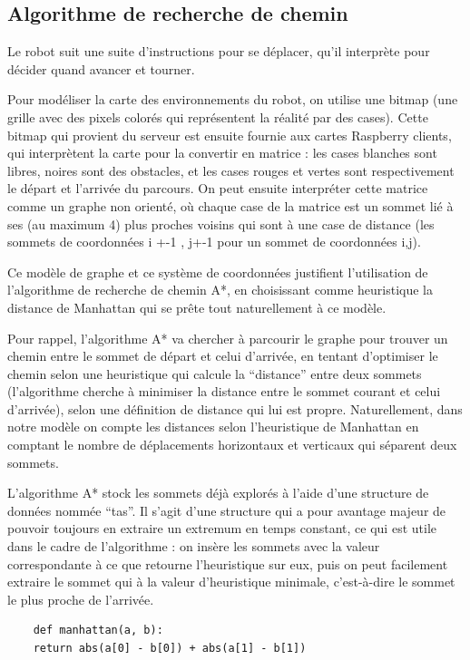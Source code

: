 \documentclass[a4paper,12pt]{report}  %
\begin{document}
\subsection{Algorithme de recherche de chemin}
Le robot suit une suite d’instructions pour se déplacer, qu’il interprète pour décider quand avancer et tourner.

Pour modéliser la carte des environnements du robot, on utilise une bitmap (une grille avec des pixels colorés qui représentent la réalité par des cases). Cette bitmap qui provient du serveur est ensuite fournie aux cartes Raspberry clients, qui interprètent la carte pour la convertir en matrice : les cases blanches sont libres, noires sont des obstacles, et les cases rouges et vertes sont respectivement le départ et l’arrivée du parcours. On peut ensuite interpréter cette matrice comme un graphe non orienté, où chaque case de la matrice est un sommet lié à ses (au maximum 4) plus proches voisins qui sont à une case de distance (les sommets de coordonnées i +-1 , j+-1 pour un sommet de coordonnées i,j).

Ce modèle de graphe et ce système de coordonnées justifient l’utilisation de l’algorithme de recherche de chemin A*, en choisissant comme heuristique la distance de Manhattan qui se prête tout naturellement à ce modèle.

Pour rappel, l’algorithme A* va chercher à parcourir le graphe pour trouver un chemin entre le sommet de départ et celui d’arrivée, en tentant d’optimiser le chemin selon une heuristique qui calcule la “distance” entre deux sommets (l’algorithme cherche à minimiser la distance entre le sommet courant et celui d’arrivée), selon une définition de distance qui lui est propre. Naturellement, dans notre modèle on compte les distances selon l’heuristique de Manhattan en comptant le nombre de déplacements horizontaux et verticaux qui séparent deux sommets.

L’algorithme A* stock les sommets déjà explorés à l’aide d’une structure de données nommée “tas”. Il s’agit d’une structure qui a pour avantage majeur de pouvoir toujours en extraire un extremum en temps constant, ce qui est utile dans le cadre de l’algorithme : on insère les sommets avec la valeur correspondante à ce que retourne l’heuristique sur eux, puis on peut facilement extraire le sommet qui à la valeur d’heuristique minimale, c’est-à-dire le sommet le plus proche de l’arrivée.

\begin{lstlisting}
	def manhattan(a, b):
	return abs(a[0] - b[0]) + abs(a[1] - b[1])
\end{lstlisting}
\end{document}
